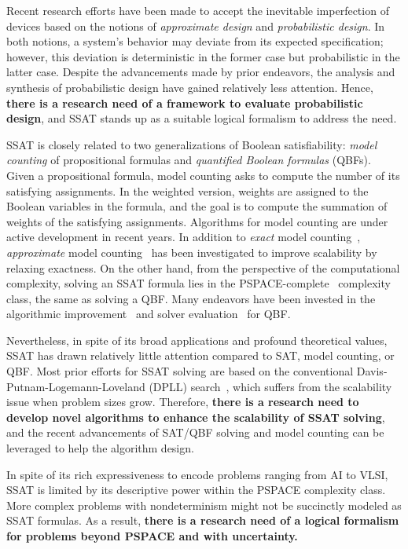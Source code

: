 Recent research efforts have been made to accept the inevitable imperfection of devices
based on the notions of \textit{approximate design} and \textit{probabilistic design}.
In both notions, a system's behavior may deviate from its expected specification;
however, this deviation is deterministic in the former case but probabilistic in the latter case.
Despite the advancements made by prior endeavors,
the analysis and synthesis of probabilistic design have gained relatively less attention.
Hence,
\textbf{there is a research need of a framework to evaluate probabilistic design},
and SSAT stands up as a suitable logical formalism to address the need.

SSAT is closely related to two generalizations of Boolean satisfiability:
\textit{model counting} of propositional formulas and \textit{quantified Boolean formulas} (QBFs).
Given a propositional formula, model counting asks to compute the number of its satisfying assignments.
In the weighted version, weights are assigned to the Boolean variables in the formula,
and the goal is to compute the summation of weights of the satisfying assignments.
Algorithms for model counting are under active development in recent years.
In addition to \textit{exact} model counting~\cite{Sang2004,Sang2005ModelCounting},
\textit{approximate} model counting~\cite{Gomes2006,Gomes2007,Chakraborty2016}
has been investigated to improve scalability by relaxing exactness.
On the other hand, from the perspective of the computational complexity,
solving an SSAT formula lies in the PSPACE-complete~\cite{Stockmeyer1973} complexity class,
the same as solving a QBF.
Many endeavors have been invested in the algorithmic improvement~\cite{SATHandbook-QBF}
and solver evaluation~\cite{Narizzano2006} for QBF.

Nevertheless, in spite of its broad applications and profound theoretical values,
SSAT has drawn relatively little attention compared to SAT, model counting, or QBF.
Most prior efforts for SSAT solving are based on the conventional
Davis-Putnam-Logemann-Loveland (DPLL) search~\cite{Davis1962},
which suffers from the scalability issue when problem sizes grow.
Therefore, \textbf{there is a research need to develop novel algorithms to enhance the scalability of SSAT solving},
and the recent advancements of SAT/QBF solving and model counting can be leveraged to help the algorithm design.

In spite of its rich expressiveness to encode problems ranging from AI to VLSI,
SSAT is limited by its descriptive power within the PSPACE complexity class.
More complex problems with nondeterminism might not be succinctly modeled as SSAT formulas.
As a result, \textbf{there is a research need of a logical formalism for problems beyond PSPACE and with uncertainty.}

